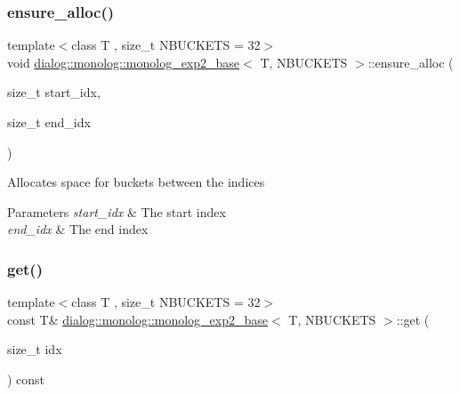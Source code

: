 \subsubsection{\texorpdfstring{ensure\+\_\+alloc()}{ensure\_alloc()}}
{\footnotesize\ttfamily template$<$class T , size\+\_\+t N\+B\+U\+C\+K\+E\+TS = 32$>$ \\
void \hyperlink{classdialog_1_1monolog_1_1monolog__exp2__base}{dialog\+::monolog\+::monolog\+\_\+exp2\+\_\+base}$<$ T, N\+B\+U\+C\+K\+E\+TS $>$\+::ensure\+\_\+alloc (\begin{DoxyParamCaption}\item[{size\+\_\+t}]{start\+\_\+idx,  }\item[{size\+\_\+t}]{end\+\_\+idx }\end{DoxyParamCaption})\hspace{0.3cm}{\ttfamily [inline]}}

Allocates space for buckets between the indices 
\begin{DoxyParams}{Parameters}
{\em start\+\_\+idx} & The start index \\
\hline
{\em end\+\_\+idx} & The end index \\
\hline
\end{DoxyParams}
\mbox{\label{classdialog_1_1monolog_1_1monolog__exp2__base_acfb1656dd72bad1eba0d7e891899e3dc}} 
\subsubsection{\texorpdfstring{get()}{get()}\hspace{0.1cm}{\footnotesize\ttfamily [1/2]}}
{\footnotesize\ttfamily template$<$class T , size\+\_\+t N\+B\+U\+C\+K\+E\+TS = 32$>$ \\
const T\& \hyperlink{classdialog_1_1monolog_1_1monolog__exp2__base}{dialog\+::monolog\+::monolog\+\_\+exp2\+\_\+base}$<$ T, N\+B\+U\+C\+K\+E\+TS $>$\+::get (\begin{DoxyParamCaption}\item[{size\+\_\+t}]{idx }\end{DoxyParamCaption}) const\hspace{0.3cm}{\ttfamily [inline]}}

